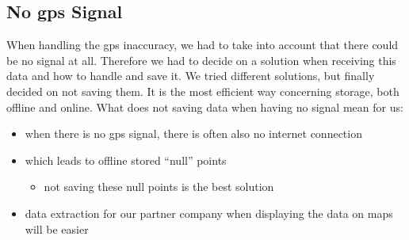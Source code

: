 \begin{center}
\end{center}

\subsection{No \gls{gps} Signal}
When handling the \gls{gps} inaccuracy, we had to take into account that there could be no signal at all. Therefore we had to decide on a solution when receiving this data and how to handle and save it.
\newline \newline
We tried different solutions, but finally decided on not saving them. It is the most efficient way concerning storage, both offline and online.
\newline \newline
What does not saving data when having no signal mean for us:
\begin{itemize}
\item when there is no \gls{gps} signal, there is often also no internet connection
\item which leads to offline stored “null” points
	\begin{itemize}
	\item not saving these null points is the best solution
	\end{itemize}		
\item data extraction for our partner company when displaying the data on maps will be easier
\end{itemize}